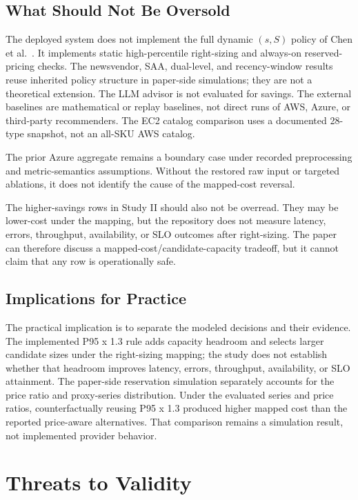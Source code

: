 \documentclass[11pt]{article}
\begin{document}
\subsection{What Should Not Be Oversold}

The deployed system does not implement the full dynamic $(s,S)$ policy of
Chen et al.~\cite{chen2024capacity}. It implements static high-percentile
right-sizing and always-on reserved-pricing checks. The newsvendor, SAA,
dual-level, and recency-window results reuse inherited policy structure in
paper-side simulations; they are not a theoretical extension. The LLM advisor
is not evaluated for savings. The external baselines are mathematical or
replay baselines, not direct runs of AWS, Azure, or third-party recommenders.
The EC2 catalog comparison uses a documented 28-type snapshot, not an all-SKU
AWS catalog.

The prior Azure aggregate remains a boundary case under recorded preprocessing
and metric-semantics assumptions. Without the restored raw input or targeted
ablations, it does not identify the cause of the mapped-cost reversal.

The higher-savings rows in Study II should also not be overread. They may be
lower-cost under the mapping, but the repository does not measure latency,
errors, throughput, availability, or SLO outcomes after right-sizing. The
paper can therefore discuss a mapped-cost/candidate-capacity tradeoff, but it
cannot claim that any row is operationally safe.

\subsection{Implications for Practice}

The practical implication is to separate the modeled decisions and their
evidence. The implemented P95 x 1.3 rule adds capacity headroom and selects
larger candidate sizes under the right-sizing mapping; the study does not
establish whether that headroom improves latency, errors, throughput,
availability, or SLO attainment. The paper-side reservation simulation
separately accounts for the price ratio and proxy-series distribution. Under
the evaluated series and price ratios, counterfactually reusing P95 x 1.3
produced higher mapped cost than the reported price-aware alternatives. That
comparison remains a simulation result, not implemented provider behavior.

\section{Threats to Validity}
\end{document}
